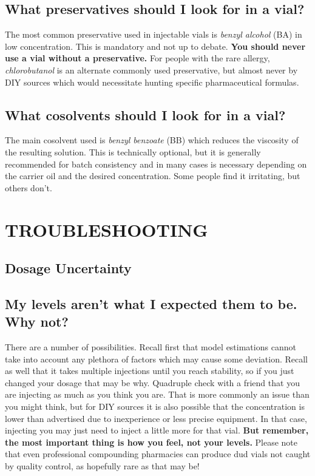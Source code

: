 \documentclass{article}
\begin{document}
\subsection{What preservatives should I look for in a vial?}\label{6-17}

The most common preservative used in injectable vials is \textit{benzyl alcohol} (BA) in low concentration. This is mandatory and not up to debate. \textbf{You should never use a vial without a preservative.} For people with the rare allergy, \textit{chlorobutanol} is an alternate commonly used preservative, but almost never by DIY sources which would necessitate hunting specific pharmaceutical formulas.

\subsection{What cosolvents should I look for in a vial?}

The main cosolvent used is \textit{benzyl benzoate} (BB) which reduces the viscosity of the resulting solution. This is technically optional, but it is generally recommended for batch consistency and in many cases is necessary depending on the carrier oil and the desired concentration. Some people find it irritating, but others don’t.



\section{TROUBLESHOOTING}

\subsection*{Dosage Uncertainty}

\subsection{My levels aren’t what I expected them to be. Why not?}

There are a number of possibilities. Recall first that model estimations cannot take into account any plethora of factors which may cause some deviation. Recall as well that it takes multiple injections until you reach stability, so if you just changed your dosage that may be why. Quadruple check with a friend that you are injecting as much as you think you are. That is more commonly an issue than you might think, but for DIY sources it is also possible that the concentration is lower than advertised due to inexperience or less precise equipment. In that case, injecting you may just need to inject a little more for that vial. \textbf{But remember, the most important thing is how you feel, not your levels.} Please note that even professional compounding pharmacies can produce dud vials not caught by quality control, as hopefully rare as that may be!
\end{document}

